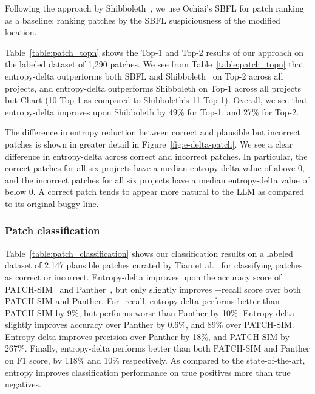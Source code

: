 \documentclass[12pt,openany,oneside,table]{cmuthesis}
\begin{document}
Following the approach by Shibboleth~\cite{Shibboleth}, we use Ochiai's SBFL for patch ranking as a baseline: ranking patches by the SBFL suspiciousness of the modified location. 

Table~\ref{table:patch_topn} shows the Top-1
and Top-2 results of our approach on the labeled dataset of 1,290 patches. We
see from Table~\ref{table:patch_topn} that entropy-delta outperforms both SBFL
and Shibboleth~\cite{Shibboleth} on Top-2 across all projects, and entropy-delta outperforms
Shibboleth on Top-1 across all projects but Chart (10 Top-1 as compared to
Shibboleth's 11 Top-1). Overall, we see that entropy-delta improves upon
Shibboleth by 49\% for Top-1, and 27\% for Top-2.

The difference in entropy reduction between correct and plausible but incorrect
patches is shown in greater detail in Figure~\ref{fig:e-delta-patch}. We see a
clear difference in entropy-delta across correct and incorrect patches. In
particular, the correct patches for all six projects have a median entropy-delta
value of above 0, and the incorrect patches for all six projects have a median
entropy-delta value of below 0. A correct patch tends to appear
more natural to the LLM as compared to its original buggy line. 

\subsubsection{Patch classification}

 Table~\ref{table:patch_classification} shows our classification results on a
labeled dataset of 2,147 plausible patches curated by Tian et al.~\cite{Panther}
for classifying patches as correct or incorrect. Entropy-delta 
improves upon the accuracy score of PATCH-SIM~\cite{patch-sim} and Panther~\cite{Panther}, but only slightly
improves +recall score over both PATCH-SIM and Panther. For -recall,
entropy-delta performs better than PATCH-SIM by 9\%, but performs worse than
Panther by 10\%. Entropy-delta slightly improves accuracy over Panther by 0.6\%,
and 89\% over PATCH-SIM. Entropy-delta improves precision over Panther by 18\%,
and PATCH-SIM by 267\%. Finally, entropy-delta performs better than both
PATCH-SIM and Panther on F1 score, by 118\% and 10\% respectively. As compared to the state-of-the-art, entropy improves classification performance on true positives more than true negatives. 
\end{document}
